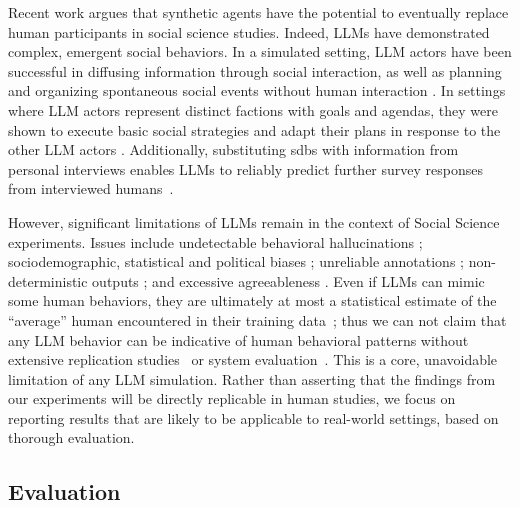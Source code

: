 Recent work \cite{grossman_2023, tornberg_2023,argyle2023} argues that synthetic agents have the potential to eventually replace human participants in social science studies. Indeed, LLMs have demonstrated complex, emergent social behaviors. In a simulated setting, LLM actors have been successful in diffusing information through social interaction, as well as planning and organizing spontaneous social events without human interaction \cite{park_2023_game}. In settings where LLM actors represent distinct factions with goals and agendas, they were shown to execute basic social strategies and adapt their plans in response to the other LLM actors \cite{abdelnabi_negotiations}. Additionally, substituting \acp{sdb} with information from personal interviews enables LLMs to reliably predict further survey responses from interviewed humans~\cite{park2024generativeagentsimulations1000}. %

However, significant limitations of LLMs remain in the context of Social Science experiments. Issues include undetectable behavioral hallucinations \cite{rossi_2024}; sociodemographic, statistical and political biases \cite{anthis_2025,hewitt2024predicting,rossi_2024,Taubenfeld2024SystematicBI}; unreliable annotations \cite{jansen_2023,bisbee_2023,neumann_2025,Gligoric2024CanUL}; non-deterministic outputs \cite{atil_2025,bisbee_2023}; and excessive agreeableness \cite{park_2023_game,anthis_2025,rossi_2024}. Even if LLMs can mimic some human behaviors, they are ultimately at most a statistical estimate of the ``average'' human encountered in their training data~\cite{rossi_2024}; thus we can not claim that any LLM behavior can be indicative of human behavioral patterns without extensive replication studies~\cite{rossi_2024} or system evaluation~\cite{adornetto2025_gabms}. This is a core, unavoidable limitation of any LLM simulation. Rather than asserting that the findings from our experiments will be directly replicable in human studies, we focus on reporting results that are likely to be applicable to real-world settings, based on thorough evaluation.



\subsection{Evaluation}
\label{sec:related:quality}



